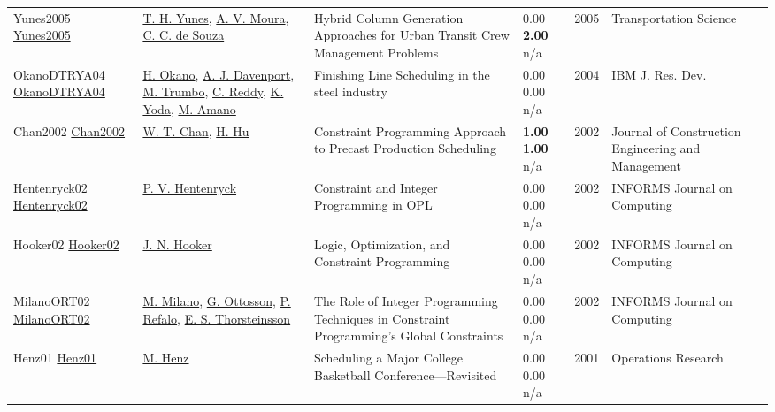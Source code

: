 {\begin{longtable}{p{3cm}p{5cm}p{10cm}p{1cm}rp{2.5cm}l}
Yunes2005 \href{http://dx.doi.org/10.1287/trsc.1030.0078}{Yunes2005} & \hyperref[auth:a941]{T. H. Yunes}, \hyperref[auth:a1578]{A. V. Moura}, \hyperref[auth:a170]{C. C. de Souza} & Hybrid Column Generation Approaches for Urban Transit Crew Management Problems & \noindent{}\textcolor{black!50}{0.00} \textbf{2.00} n/a & 2005 & \cellcolor{red!20}Transportation Science & \cite{Yunes2005}\\
OkanoDTRYA04 \href{https://doi.org/10.1147/rd.485.0811}{OkanoDTRYA04} & \hyperref[auth:a1287]{H. Okano}, \hyperref[auth:a248]{A. J. Davenport}, \hyperref[auth:a1288]{M. Trumbo}, \hyperref[auth:a250]{C. Reddy}, \hyperref[auth:a1289]{K. Yoda}, \hyperref[auth:a1290]{M. Amano} & Finishing Line Scheduling in the steel industry & \noindent{}\textcolor{black!50}{0.00} \textcolor{black!50}{0.00} n/a & 2004 & {IBM} J. Res. Dev. & \cite{OkanoDTRYA04}\\
Chan2002 \href{http://dx.doi.org/10.1061/(asce)0733-9364(2002)128:6(513)}{Chan2002} & \hyperref[auth:a1660]{W. T. Chan}, \hyperref[auth:a1661]{H. Hu} & Constraint Programming Approach to Precast Production Scheduling & \noindent{}\textbf{1.00} \textbf{1.00} n/a & 2002 & Journal of Construction Engineering and Management & \cite{Chan2002}\\
Hentenryck02 \href{http://dx.doi.org/10.1287/ijoc.14.4.345.2826}{Hentenryck02} & \hyperref[auth:a148]{P. V. Hentenryck} & Constraint and Integer Programming in OPL & \noindent{}\textcolor{black!50}{0.00} \textcolor{black!50}{0.00} n/a & 2002 & \cellcolor{red!20}INFORMS Journal on Computing & \cite{Hentenryck02}\\
Hooker02 \href{http://dx.doi.org/10.1287/ijoc.14.4.295.2828}{Hooker02} & \hyperref[auth:a160]{J. N. Hooker} & Logic, Optimization, and Constraint Programming & \noindent{}\textcolor{black!50}{0.00} \textcolor{black!50}{0.00} n/a & 2002 & \cellcolor{red!20}INFORMS Journal on Computing & \cite{Hooker02}\\
MilanoORT02 \href{http://dx.doi.org/10.1287/ijoc.14.4.387.2830}{MilanoORT02} & \hyperref[auth:a143]{M. Milano}, \hyperref[auth:a851]{G. Ottosson}, \hyperref[auth:a254]{P. Refalo}, \hyperref[auth:a873]{E. S. Thorsteinsson} & The Role of Integer Programming Techniques in Constraint Programming's Global Constraints & \noindent{}\textcolor{black!50}{0.00} \textcolor{black!50}{0.00} n/a & 2002 & \cellcolor{red!20}INFORMS Journal on Computing & \cite{MilanoORT02}\\
Henz01 \href{http://dx.doi.org/10.1287/opre.49.1.163.11193}{Henz01} & \hyperref[auth:a1418]{M. Henz} & Scheduling a Major College Basketball Conference—Revisited & \noindent{}\textcolor{black!50}{0.00} \textcolor{black!50}{0.00} n/a & 2001 & \cellcolor{red!20}Operations Research & \cite{Henz01}\\

\end{longtable}}
